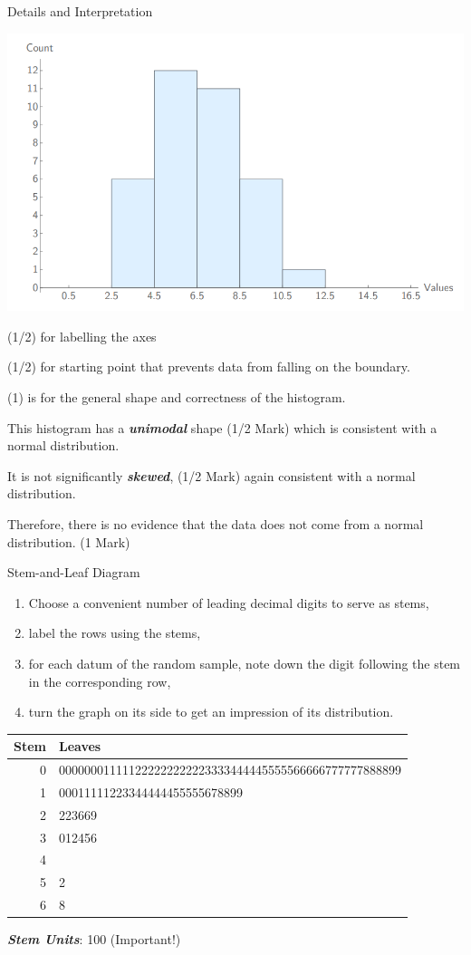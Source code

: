 \documentclass{beamer}
\newcommand{\bb}[1]{\textcolor{antiquefuchsia}{\textbf{\textit{#1}}}}
\begin{document}
\begin{frame}{Details and Interpretation}
\begin{center}
\includegraphics[scale=0.25]{ex1.png}
\end{center}
(1/2) for labelling the axes

(1/2) for starting point that prevents data from falling on the boundary.

(1) is for the general shape and correctness of the histogram.


This histogram has a \bb{unimodal} shape (1/2 Mark) which is consistent with a normal distribution.

It is not significantly \bb{skewed}, (1/2 Mark) again consistent with a normal distribution.

Therefore, there is no evidence that the data does not come from a normal distribution. (1 Mark)
\end{frame}

\begin{frame}{Stem-and-Leaf Diagram}
\begin{enumerate}
\item Choose a convenient number of leading decimal digits to serve as stems,
\item label the rows using the stems,
\item for each datum of the random sample, note down the digit following the stem in the corresponding row,
\item turn the graph on its side to get an impression of its distribution.
\end{enumerate}
\begin{tabular}{r|l} 
Stem & Leaves \\
\hline 0 & 000000011111222222222223333444445555566666777777888899 \\
1 & 00011111223344444455555678899 \\
2 & 223669 \\
3 & 012456 \\
4 & \\
5 & 2 \\
6 & 8
\end{tabular}
\bb{Stem Units}: 100 (Important!)
\end{frame}
\end{document}
